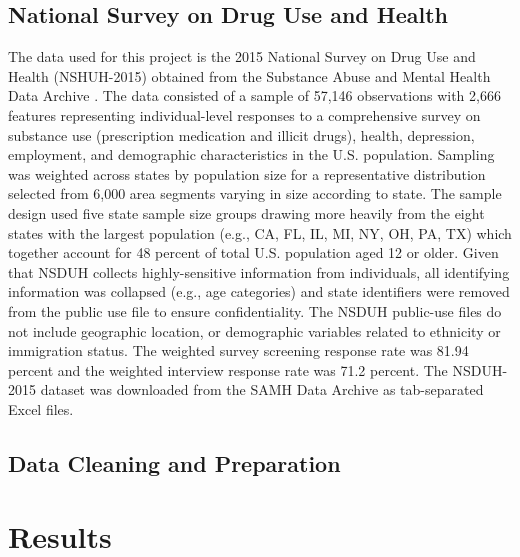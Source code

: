 \documentclass[sigconf]{acmart}
\begin{document}
\subsection{National Survey on Drug Use and Health} 

The data used for this project is the 2015 National Survey on Drug Use and 
Health (NSHUH-2015) obtained from the Substance Abuse and Mental Health Data 
Archive \cite{samhsa16}. The data consisted of a sample of 57,146 observations 
with 2,666 features representing individual-level responses to a comprehensive 
survey on substance use (prescription medication and illicit drugs), health, 
depression, employment, and demographic characteristics in the U.S. population. 
Sampling was weighted across states by population size for a representative 
distribution selected from 6,000 area segments varying in size according to 
state. The sample design used five state sample size groups drawing more 
heavily from the eight states with the largest population (e.g., CA, FL, IL, MI, 
NY, OH, PA, TX) which together account for 48 percent of total U.S. population 
aged 12 or older. Given that NSDUH collects highly-sensitive information from 
individuals, all identifying information was collapsed (e.g., age categories)
and state identifiers were removed from the public use file to ensure 
confidentiality. The NSDUH public-use files do not include geographic location, 
or demographic variables related to ethnicity or immigration status. The 
weighted survey screening response rate was 81.94 percent and the weighted
interview response rate was 71.2 percent. The NSDUH-2015 dataset was 
downloaded from the SAMH Data Archive as tab-separated Excel files.




\subsection{Data Cleaning and Preparation}



\cite{mckinney17}






\section{Results}
\end{document}
